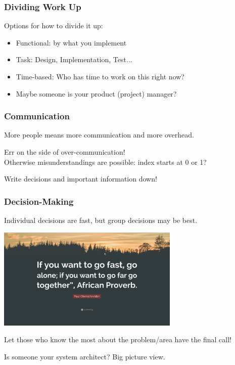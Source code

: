 \begin{frame}
\frametitle{Dividing Work Up}

Options for how to divide it up:

\begin{itemize}
	\item Functional: by what you implement
	\item Task: Design, Implementation, Test...
	\item Time-based: Who has time to work on this right now?
	\item Maybe someone is your product (project) manager?
\end{itemize}

\end{frame}

\begin{frame}
\frametitle{Communication}

More people means more communication and more overhead.

Err on the side of over-communication!\\
\quad Otherwise misunderstandings are possible: index starts at 0 or 1?

Write decisions and important information down!

\end{frame}

\begin{frame}
\frametitle{Decision-Making}

Individual decisions are fast, but group decisions may be best.

\begin{center}
	\includegraphics[width=0.65\textwidth]{images/proverb.jpeg}
\end{center}

Let those who know the most about the problem/area have the final call!

Is someone your system architect? Big picture view.

\end{frame}

